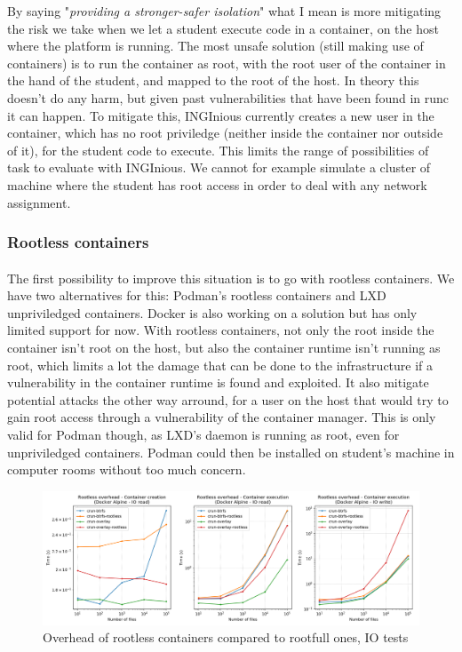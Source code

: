 By saying "\textit{providing a stronger-safer isolation}" what I mean is more mitigating the risk we take when we let a student execute code in a container, on the host where the platform is running.  The most unsafe solution (still making use of containers) is to run the container as root, with the root user of the container in the hand of the student, and mapped to the root of the host.  In theory this doesn't do any harm, but given past vulnerabilities that have been found in runc it can happen.  To mitigate this, INGInious currently creates a new user in the container, which has no root priviledge (neither inside the container nor outside of it), for the student code to execute.  This limits the range of possibilities of task to evaluate with INGInious.  We cannot for example simulate a cluster of machine where the student has root access in order to deal with any network assignment.

\subsubsection{Rootless containers}
\paragraph{}The first possibility to improve this situation is to go with rootless containers.  We have two alternatives for this: Podman's rootless containers and LXD unpriviledged containers.  Docker is also working on a solution but has only limited support for now.  With rootless containers, not only the root inside the container isn't root on the host, but also the container runtime isn't running as root, which limits a lot the damage that can be done to the infrastructure if a vulnerability in the container runtime is found and exploited.  It also mitigate potential attacks the other way arround, for a user on the host that would try to gain root access through a vulnerability of the container manager.  This is only valid for Podman though, as LXD's daemon is running as root, even for unpriviledged containers.  Podman could then be installed on student's machine in computer rooms without too much concern.

\begin{figure}[h!]
  \begin{center}
    \includegraphics[width=\linewidth]{images/question-3-rootless-io.png}
    \caption{Overhead of rootless containers compared to rootfull ones, IO tests}
    \label{fig:q3:rootless:io}
  \end{center}
\end{figure}

